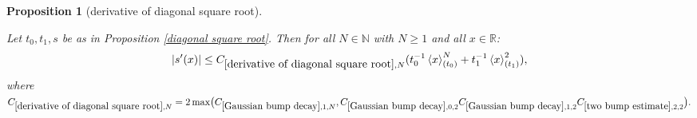 \documentclass[12pt,reqno]{amsart}
\theoremstyle{plain}
\newtheorem{proposition}[theorem]{Proposition}
\numberwithin{equation}{section}
\theoremstyle{remark}
\newcommand{\uses}[1]{}
\newcommand{\usesdefs}[1]{}
\newcommand{\leanok}{}
\newcommand{\lean}[1]{}
\newcommand{\R}{{\mathbb R}}
\newcommand{\N}{{\mathbb N}}
\begin{document}
\begin{proposition}[derivative of diagonal square root]\label{derivative of diagonal square root}\uses{square root of Gaussian decay,Elementary Gaussian properties,Gaussian bump decay,two bump estimate,diagonal square root}\usesdefs{gaussian,bracket bump}
\lean{Auto.derivativeDiagonalSquareRoot_differentiable,Auto.derivativeDiagonalSquareRoot_bound}
\leanok
Let $t_0,t_1,s$ be as in Proposition \ref{diagonal square root}.
Then for all $N\in\N$ with $N\ge1$ and all $x\in\R$:
\begin{equation}\label{E:s-derivative-estimate}
    |s'(x)|\le  C_{\ref{derivative of diagonal square root},N} ( t_0^{-1} \left<x\right>^N_{(t_0)}+ t_1^{-1}\left<x\right>^2_{(t_1)}),
\end{equation}
where
$C_{\ref{derivative of diagonal square root},N}
=
2\max\bigl(
C_{\ref{Gaussian bump decay},1,N},
C_{\ref{Gaussian bump decay},0,2}
C_{\ref{Gaussian bump decay},1,2}
C_{\ref{two bump estimate},2,2}
\bigr).$
\end{proposition}
\end{document}
